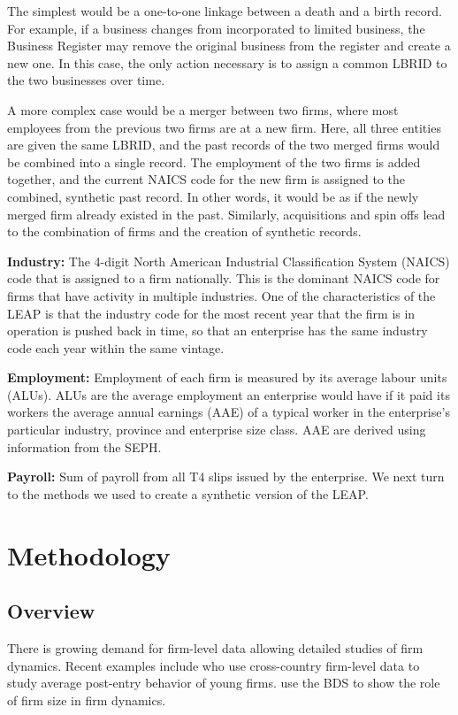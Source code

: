 \documentclass{article}
\begin{document}
The simplest would be a one-to-one linkage between a death and a birth record. For example, if a business changes from incorporated to limited business, the Business Register may remove the original business from the register and create a new one. In this case, the only action necessary is to assign a common LBRID to the two businesses over time. 

A more complex case would be a merger between two firms, where most employees from the previous two firms are at a new firm. Here, all three entities are given the same LBRID, and the past records of the two merged firms would be combined into a single record. The employment of the two firms is added together, and the current NAICS code for the new firm is assigned to the combined, synthetic past record. In other words, it would be as if the newly merged firm already existed in the past. Similarly, acquisitions and spin offs lead to the combination of firms and the creation of synthetic records. 

\textbf{Industry:} The 4-digit North American Industrial Classification System (NAICS) code that is assigned to a firm nationally. This is the dominant NAICS code for firms that have activity in multiple industries. One of the characteristics of the LEAP is that the industry code for the most recent year that the firm is in operation is pushed back in time, so that an enterprise has the same industry code each year within the same vintage.  

\textbf{Employment:} Employment of each firm is measured by its average labour units (ALUs). ALUs are the average employment an enterprise would have if it paid its workers the average annual earnings (AAE) of a typical worker in the enterprise's particular industry, province and enterprise size class. AAE are derived using information from the SEPH.

\textbf{Payroll:} Sum of payroll from all T4 slips issued by the enterprise.
We next turn to the methods we used to create a synthetic version of the LEAP.

\section{Methodology}

\subsection{Overview}

There is growing demand for firm-level data allowing detailed studies of firm dynamics. Recent examples include \textcite{NBERc0480} who use cross-country firm-level data to study average post-entry behavior of young firms. \textcite{10.1257/aer.20141280} use the BDS  to show the role of firm size in firm dynamics. %
\end{document}
